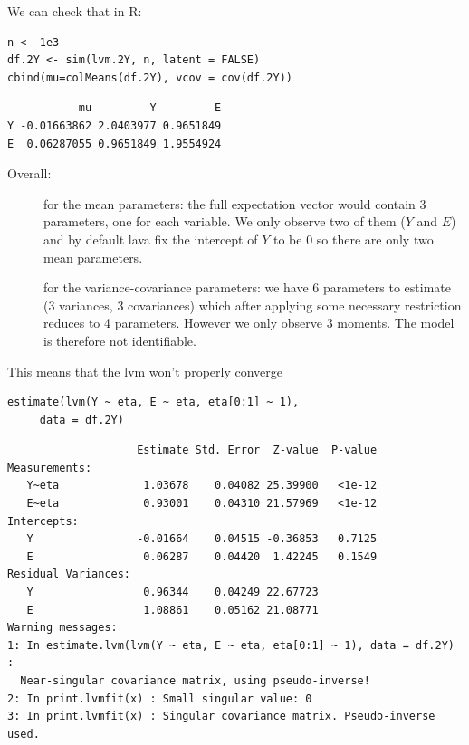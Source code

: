 \documentclass[12pt]{article}
\newcommand{\Cross}{{\raisebox{-0.5ex}%
{\relsize{1.5}\ding{56}}}\hspace{1pt} }
\newcommand{\Valid}{{\raisebox{-0.5ex}%
{\relsize{1.5}\ding{52}}}\hspace{1pt} }
\newcommand{\CrossR}{ \textcolor{red}{\Cross} }
\newcommand{\ValidV}{ \textcolor{green}{\Valid} }
\begin{document}
We can check that in R:
\lstset{language=r,label= ,caption= ,captionpos=b,numbers=none}
\begin{lstlisting}
n <- 1e3
df.2Y <- sim(lvm.2Y, n, latent = FALSE)
cbind(mu=colMeans(df.2Y), vcov = cov(df.2Y))
\end{lstlisting}

\begin{verbatim}
           mu         Y         E
Y -0.01663862 2.0403977 0.9651849
E  0.06287055 0.9651849 1.9554924
\end{verbatim}

Overall:
\begin{description}
\item[{\ValidV}] for the mean parameters: the full expectation vector would contain 3
parameters, one for each variable. We only observe two of them
(\(Y\) and \(E\)) and by default lava fix the intercept of \(Y\) to
be 0 so there are only two mean parameters.
\item[{\CrossR}] for the variance-covariance parameters: we have 6
parameters to estimate (3 variances, 3 covariances) which
after applying some necessary restriction reduces to 4
parameters. However we only observe 3 moments. The model
is therefore not identifiable.
\end{description}
This means that the lvm won't properly converge
\lstset{language=r,label= ,caption= ,captionpos=b,numbers=none}
\begin{lstlisting}
estimate(lvm(Y ~ eta, E ~ eta, eta[0:1] ~ 1), 
	 data = df.2Y)
\end{lstlisting}

\begin{verbatim}
                    Estimate Std. Error  Z-value  P-value
Measurements:                                            
   Y~eta             1.03678    0.04082 25.39900   <1e-12
   E~eta             0.93001    0.04310 21.57969   <1e-12
Intercepts:                                              
   Y                -0.01664    0.04515 -0.36853   0.7125
   E                 0.06287    0.04420  1.42245   0.1549
Residual Variances:                                      
   Y                 0.96344    0.04249 22.67723         
   E                 1.08861    0.05162 21.08771         
Warning messages:
1: In estimate.lvm(lvm(Y ~ eta, E ~ eta, eta[0:1] ~ 1), data = df.2Y) :
  Near-singular covariance matrix, using pseudo-inverse!
2: In print.lvmfit(x) : Small singular value: 0
3: In print.lvmfit(x) : Singular covariance matrix. Pseudo-inverse used.
\end{verbatim}
\end{document}
